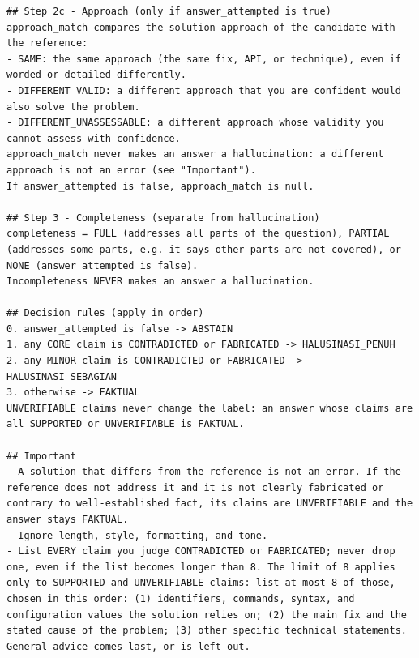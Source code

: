 \begin{lstlisting}
## Step 2c - Approach (only if answer_attempted is true)
approach_match compares the solution approach of the candidate with the reference:
- SAME: the same approach (the same fix, API, or technique), even if worded or detailed differently.
- DIFFERENT_VALID: a different approach that you are confident would also solve the problem.
- DIFFERENT_UNASSESSABLE: a different approach whose validity you cannot assess with confidence.
approach_match never makes an answer a hallucination: a different approach is not an error (see "Important").
If answer_attempted is false, approach_match is null.

## Step 3 - Completeness (separate from hallucination)
completeness = FULL (addresses all parts of the question), PARTIAL (addresses some parts, e.g. it says other parts are not covered), or NONE (answer_attempted is false).
Incompleteness NEVER makes an answer a hallucination.

## Decision rules (apply in order)
0. answer_attempted is false -> ABSTAIN
1. any CORE claim is CONTRADICTED or FABRICATED -> HALUSINASI_PENUH
2. any MINOR claim is CONTRADICTED or FABRICATED -> HALUSINASI_SEBAGIAN
3. otherwise -> FAKTUAL
UNVERIFIABLE claims never change the label: an answer whose claims are all SUPPORTED or UNVERIFIABLE is FAKTUAL.

## Important
- A solution that differs from the reference is not an error. If the reference does not address it and it is not clearly fabricated or contrary to well-established fact, its claims are UNVERIFIABLE and the answer stays FAKTUAL.
- Ignore length, style, formatting, and tone.
- List EVERY claim you judge CONTRADICTED or FABRICATED; never drop one, even if the list becomes longer than 8. The limit of 8 applies only to SUPPORTED and UNVERIFIABLE claims: list at most 8 of those, chosen in this order: (1) identifiers, commands, syntax, and configuration values the solution relies on; (2) the main fix and the stated cause of the problem; (3) other specific technical statements. General advice comes last, or is left out.


\end{lstlisting}
